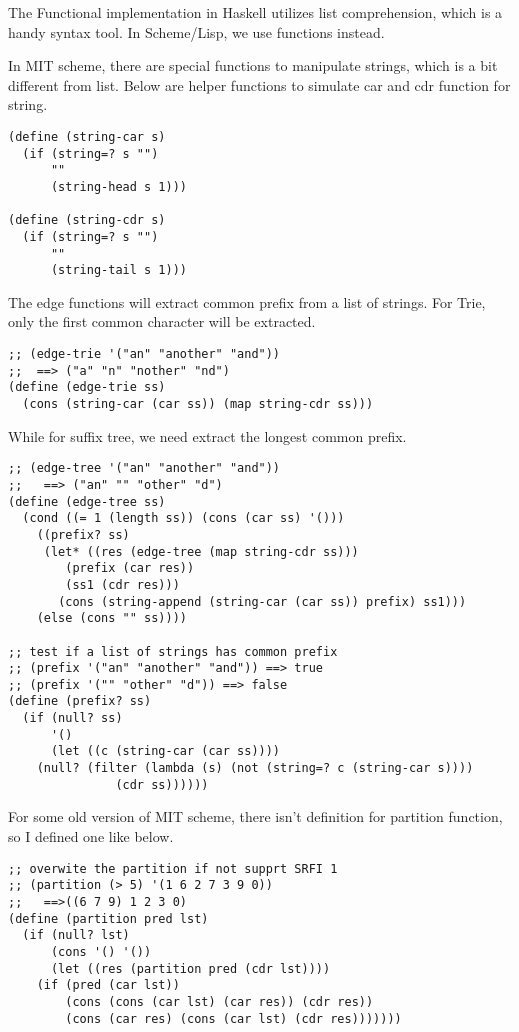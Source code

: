 \documentclass{article}
\begin{document}
The Functional implementation in Haskell utilizes list comprehension, which
is a handy syntax tool. In Scheme/Lisp, we use functions instead.

In MIT scheme, there are special functions to manipulate strings, which
is a bit different from list. Below are helper functions to simulate
car and cdr function for string.

\lstset{language=lisp}
\begin{lstlisting}
(define (string-car s)
  (if (string=? s "")
      ""
      (string-head s 1)))

(define (string-cdr s)
  (if (string=? s "")
      ""
      (string-tail s 1)))
\end{lstlisting}

The edge functions will extract common prefix from a list of strings.
For Trie, only the first common character will be extracted.

\begin{lstlisting}
;; (edge-trie '("an" "another" "and"))
;;  ==> ("a" "n" "nother" "nd")
(define (edge-trie ss)
  (cons (string-car (car ss)) (map string-cdr ss)))
\end{lstlisting}

While for suffix tree, we need extract the longest common prefix.

\begin{lstlisting}
;; (edge-tree '("an" "another" "and"))
;;   ==> ("an" "" "other" "d")
(define (edge-tree ss)
  (cond ((= 1 (length ss)) (cons (car ss) '()))
	((prefix? ss)
	 (let* ((res (edge-tree (map string-cdr ss)))
		(prefix (car res))
		(ss1 (cdr res)))
	   (cons (string-append (string-car (car ss)) prefix) ss1)))
	(else (cons "" ss))))

;; test if a list of strings has common prefix
;; (prefix '("an" "another" "and")) ==> true
;; (prefix '("" "other" "d")) ==> false
(define (prefix? ss)
  (if (null? ss)
      '()
      (let ((c (string-car (car ss))))
	(null? (filter (lambda (s) (not (string=? c (string-car s))))
		       (cdr ss))))))
\end{lstlisting}

For some old version of MIT scheme, there isn't definition for
partition function, so I defined one like below.

\begin{lstlisting}
;; overwite the partition if not supprt SRFI 1
;; (partition (> 5) '(1 6 2 7 3 9 0))
;;   ==>((6 7 9) 1 2 3 0)
(define (partition pred lst)
  (if (null? lst)
      (cons '() '())
      (let ((res (partition pred (cdr lst))))
	(if (pred (car lst))
	    (cons (cons (car lst) (car res)) (cdr res))
	    (cons (car res) (cons (car lst) (cdr res)))))))
\end{lstlisting}
\end{document}
